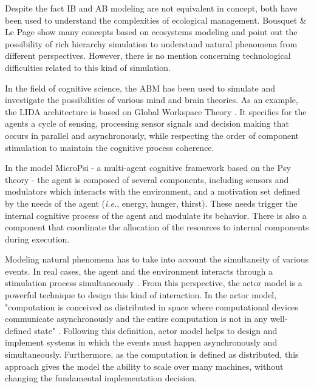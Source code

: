 \documentclass[runningheads]{llncs}
\begin{document}
Despite the fact IB and AB modeling are not equivalent in concept, both have been used to understand the complexities of ecological management. Bousquet \& Le Page\cite{Bousquet2004} show many concepts based on ecosystems modeling and point out the possibility of rich hierarchy simulation to understand natural phenomena from different perspectives. However, there is no mention concerning technological difficulties related to this kind of simulation.

In the field of cognitive science, the ABM has been used to  simulate and investigate the possibilities of various mind and brain theories. As an example, the LIDA architecture is based on Global Workspace Theory \cite{Friedlander2008}. It specifies for the agents a cycle of sensing, processing sensor signals and decision making that occurs in parallel and asynchronously, while respecting the order of component stimulation to maintain the cognitive process coherence.

In the model MicroPsi - a multi-agent cognitive framework based on the Psy theory \cite{Bach2003,Bach2012} - the agent is composed of several components, including sensors and modulators which interacts with the environment, and a motivation set defined by the needs of the agent (\textit{i.e.},  energy, hunger, thirst). These needs trigger the internal cognitive process of the agent and modulate its behavior. There is also a component that coordinate the allocation of the resources to internal components during execution. 

Modeling natural phenomena has to take into account the simultaneity of various events. In real cases, the agent and the environment interacts through a stimulation process simultaneously \cite{Maturana1987}. From this perspective, the actor model is a powerful technique to design this kind of interaction. In the actor model, "computation  is  conceived  as  distributed  in space where computational devices communicate asynchronously and the entire  computation  is  not  in  any  well-defined  state" \cite{Hewitt2012}. Following this definition, actor model helps to design and implement systems in which the events  must happen asynchronously and simultaneously. Furthermore, as the computation is defined as distributed, this approach gives the model the ability to scale over many machines, without changing the fundamental implementation decision. 
\end{document}

